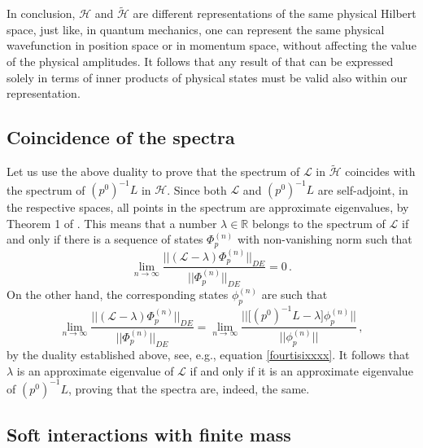 \documentclass[a4paper, amsfonts, amssymb, amsmath, reprint, showkeys, nofootinbib, twoside, onecolumn,notitlepage,,longbibliography]{revtex4-2}
\theoremstyle{definition}
\theoremstyle{theorem}
\theoremstyle{corollary}
\begin{document}
In conclusion, $\mathcal{H}$ and $\tilde{\mathcal{H}}$ are different representations of the same physical Hilbert space, just like, in quantum mechanics, one can represent the same physical wavefunction in position space or in momentum space, without affecting the value of the physical amplitudes. It follows that any result of \cite{Dudynski1988} that can be expressed solely in terms of inner products of physical states must be valid also within our representation.

\newpage
\subsection{Coincidence of the spectra}

Let us use the above duality to prove that the spectrum of $\mathcal{L}$ in $\tilde{\mathcal{H}}$ coincides with the spectrum of $(p^0)^{-1}L$ in $\mathcal{H}$. Since both $\mathcal{L}$ and $(p^0)^{-1}L$ are self-adjoint, in the respective spaces, all points in the spectrum are approximate eigenvalues, by Theorem 1 of \cite[Lecture 18]{Bhatiabook}. This means that a number $\lambda \in \mathbb{R}$ belongs to the spectrum of $\mathcal{L}$ if and only if there is a sequence of states $\Phi^{(n)}_p$ with non-vanishing norm such that
\begin{equation}
    \lim_{n\rightarrow \infty} \dfrac{||(\mathcal{L}-\lambda) \Phi_p^{(n)} ||_{DE}}{|| \Phi^{(n)}_p||_{DE}} =0 \, .
\end{equation}
On the other hand, the corresponding states $\phi_p^{(n)}$ are such that
\begin{equation}
    \lim_{n\rightarrow \infty} \dfrac{||(\mathcal{L}{-}\lambda) \Phi_p^{(n)} ||_{DE}}{|| \Phi^{(n)}_p||_{DE}} = \lim_{n\rightarrow \infty} \dfrac{||\big[(p^0)^{-1}L{-}\lambda\big] \phi_p^{(n)} ||}{|| \phi^{(n)}_p||}  \, ,
\end{equation}
by the duality established above, see, e.g., equation \eqref{fourtisixxxx}. It follows that $\lambda$ is an approximate eigenvalue of $\mathcal{L}$ if and only if it is an approximate eigenvalue of $(p^0)^{-1}L$, proving that the spectra are, indeed, the same.

\subsection{Soft interactions with finite mass}
\end{document}
